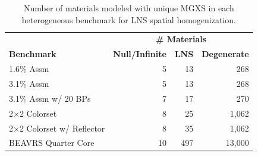 \begin{table}[h!]
  \centering
  \caption[Number of materials for LNS spatial homogenization]{Number of materials modeled with unique \ac{MGXS} in each heterogeneous benchmark for \ac{LNS} spatial homogenization.}
  \small
  \label{table:chap9-num-materials-lns}
  \vspace{6pt}
  \begin{tabular}{l r r r}
  \toprule
  \rowcolor{lightgray}
  & \multicolumn{3}{c}{\cellcolor{lightgray} \bf \# Materials} \\
  \multirow{-2}{*}{\cellcolor{lightgray} \bf Benchmark} &
  \multicolumn{1}{c}{\cellcolor{lightgray} \bf Null/Infinite} &
  \multicolumn{1}{c}{\cellcolor{lightgray} \bf \ac{LNS}} &
  \multicolumn{1}{c}{\cellcolor{lightgray} \bf Degenerate} \\
  \midrule
1.6\% Assm & 5 & 13 & 268 \\
  \midrule
3.1\% Assm & 5 & 13 & 268 \\
  \midrule
3.1\% Assm w/ 20 BPs & 7 & 17 & 270  \\
  \midrule
2$\times$2 Colorset & 8 & 25 & 1,062 \\
  \midrule
2$\times$2 Colorset w/ Reflector & 8 & 35 & 1,062 \\
  \midrule
\ac{BEAVRS} Quarter Core & 10 & 497 & 13,000 \\ %
  \bottomrule
\end{tabular}
\end{table}

